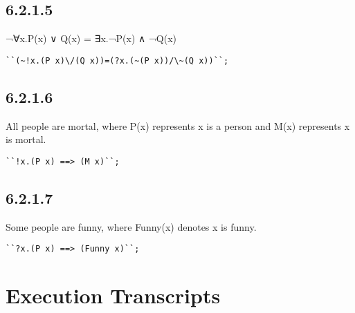 \documentclass{report}
\begin{document}
\subsection{6.2.1.5}
\label{sec:6.2.1.5}
¬∀x.P(x) ∨ Q(x) = ∃x.¬P(x) ∧ ¬Q(x)

\lstset{frameround=tttt}
\begin{lstlisting}[frame=tRBL]
``(~!x.(P x)\/(Q x))=(?x.(~(P x))/\~(Q x))``;
\end{lstlisting}

\subsection{6.2.1.6}
\label{sec:6.2.1.6}

All people are mortal, where P(x) represents x is a person and M(x) represents x is mortal.

\lstset{frameround=tttt}
\begin{lstlisting}[frame=tRBL]
``!x.(P x) ==> (M x)``;
\end{lstlisting}

\subsection{6.2.1.7}
\label{sec:6.2.1.7}

Some people are funny, where Funny(x) denotes x is funny.

\lstset{frameround=tttt}
\begin{lstlisting}[frame=tRBL]
``?x.(P x) ==> (Funny x)``;
\end{lstlisting}


\section{Execution Transcripts}
\label{sec:exec-transcr-5}
\end{document}
